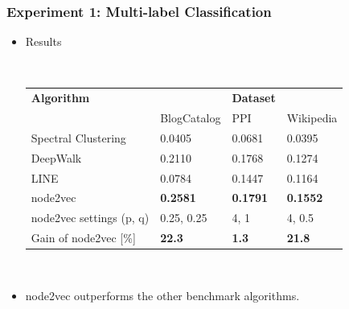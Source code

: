 \documentclass[notes, 10pt, aspectratio=169]{beamer}
\begin{document}
\begin{frame}
    \frametitle{Experiment 1: Multi-label Classification}
    \begin{itemize}
        \item Results\par
            ~\\
            \begin{tabular}{llll}
                \toprule
                \textbf{Algorithm} & & \textbf{Dataset} &\\
                             & BlogCatalog & PPI & Wikipedia\\
                \midrule
                Spectral Clustering & 0.0405 & 0.0681 & 0.0395\\
                DeepWalk & 0.2110 & 0.1768 & 0.1274\\
                LINE & 0.0784 & 0.1447 & 0.1164\\
                node2vec & \textbf{0.2581} & \textbf{0.1791} & \textbf{0.1552}\\
                \midrule
                node2vec settings (p, q) & 0.25, 0.25 & 4, 1 & 4, 0.5\\
                Gain of node2vec [\%] & \textbf{22.3} & \textbf{1.3} & \textbf{21.8}\\
                \bottomrule
            \end{tabular}
            \par~\\
        \item node2vec outperforms the other benchmark algorithms.
    \end{itemize}
\end{frame}
\end{document}
